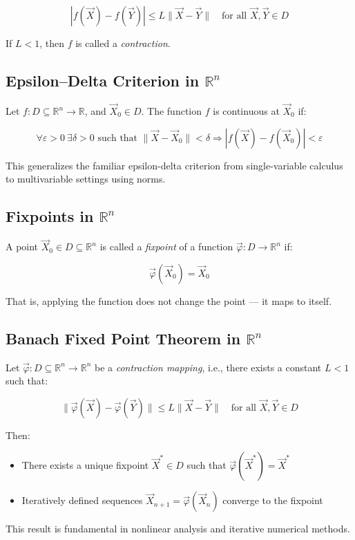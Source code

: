 \[
|f(\vec{X}) - f(\vec{Y})| \le L \|\vec{X} - \vec{Y}\| \quad \text{for all } \vec{X}, \vec{Y} \in D
\]

If \( L < 1 \), then \( f \) is called a \emph{contraction}.



\subsection{Epsilon–Delta Criterion in \( \mathbb{R}^n \)}

Let \( f : D \subseteq \mathbb{R}^n \to \mathbb{R} \), and \( \vec{X}_0 \in D \). The function \( f \) is continuous at \( \vec{X}_0 \) if:

\[
\forall \varepsilon > 0 \ \exists \delta > 0 \text{ such that } \|\vec{X} - \vec{X}_0\| < \delta \Rightarrow |f(\vec{X}) - f(\vec{X}_0)| < \varepsilon
\]

This generalizes the familiar epsilon-delta criterion from single-variable calculus to multivariable settings using norms.



\subsection{Fixpoints in \( \mathbb{R}^n \)}
  
A point \( \vec{X}_0 \in D \subseteq \mathbb{R}^n \) is called a \emph{fixpoint} of a function \( \vec{\varphi} : D \to \mathbb{R}^n \) if:

\[
\vec{\varphi}(\vec{X}_0) = \vec{X}_0
\]

That is, applying the function does not change the point — it maps to itself.



\subsection{Banach Fixed Point Theorem in \( \mathbb{R}^n \)}

Let \( \vec{\varphi} : D \subseteq \mathbb{R}^n \to \mathbb{R}^n \) be a \emph{contraction mapping}, i.e., there exists a constant \( L < 1 \) such that:

\[
\|\vec{\varphi}(\vec{X}) - \vec{\varphi}(\vec{Y})\| \le L \|\vec{X} - \vec{Y}\| \quad \text{for all } \vec{X}, \vec{Y} \in D
\]

Then:
\begin{itemize}[label=\(-\)]
\item There exists a unique fixpoint \( \vec{X}^* \in D \) such that \( \vec{\varphi}(\vec{X}^*) = \vec{X}^* \)
\item Iteratively defined sequences \( \vec{X}_{n+1} = \vec{\varphi}(\vec{X}_n) \) converge to the fixpoint
\end{itemize}

This result is fundamental in nonlinear analysis and iterative numerical methods.



\newpage